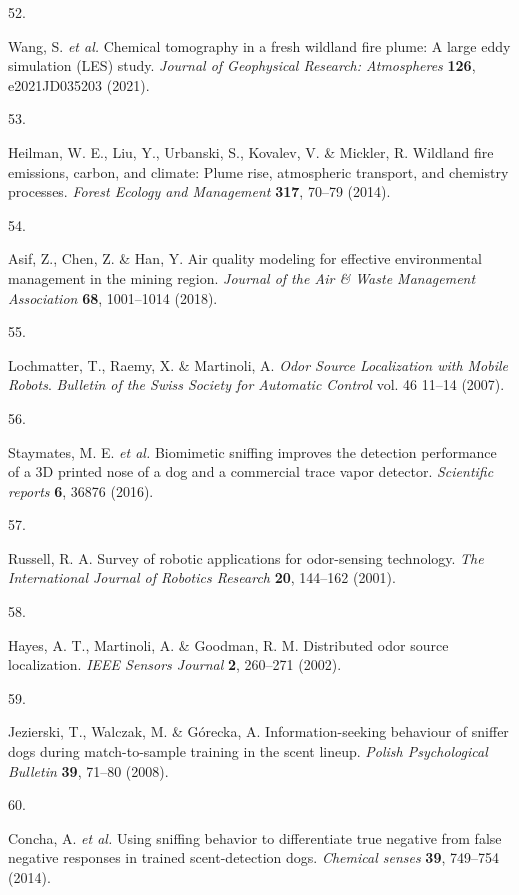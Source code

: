 \documentclass[
]{article}
\newlength{\cslhangindent}
\newlength{\csllabelwidth}
\newlength{\cslentryspacingunit} %
\newenvironment{CSLReferences}[2] %
 {%
  \setlength{\parindent}{0pt}
  \ifodd #1
  \let\oldpar\par
  \def\par{\hangindent=\cslhangindent\oldpar}
  \fi
  \setlength{\parskip}{#2\cslentryspacingunit}
 }%
 {}
\newcommand{\CSLLeftMargin}[1]{\parbox[t]{\csllabelwidth}{#1}}
\newcommand{\CSLRightInline}[1]{\parbox[t]{\linewidth - \csllabelwidth}{#1}\break}
\begin{document}
\begin{CSLReferences}{0}{0}
\leavevmode{}%
\CSLLeftMargin{52. }%
\CSLRightInline{Wang, S. \emph{et al.} Chemical tomography in a fresh wildland fire plume: A large eddy simulation (LES) study. \emph{Journal of Geophysical Research: Atmospheres} \textbf{126}, e2021JD035203 (2021).}

\leavevmode{}%
\CSLLeftMargin{53. }%
\CSLRightInline{Heilman, W. E., Liu, Y., Urbanski, S., Kovalev, V. \& Mickler, R. Wildland fire emissions, carbon, and climate: Plume rise, atmospheric transport, and chemistry processes. \emph{Forest Ecology and Management} \textbf{317}, 70--79 (2014).}

\leavevmode{}%
\CSLLeftMargin{54. }%
\CSLRightInline{Asif, Z., Chen, Z. \& Han, Y. Air quality modeling for effective environmental management in the mining region. \emph{Journal of the Air \& Waste Management Association} \textbf{68}, 1001--1014 (2018).}

\leavevmode{}%
\CSLLeftMargin{55. }%
\CSLRightInline{Lochmatter, T., Raemy, X. \& Martinoli, A. \emph{Odor Source Localization with Mobile Robots}. \emph{Bulletin of the Swiss Society for Automatic Control} vol. 46 11--14 (2007).}

\leavevmode{}%
\CSLLeftMargin{56. }%
\CSLRightInline{Staymates, M. E. \emph{et al.} Biomimetic sniffing improves the detection performance of a 3D printed nose of a dog and a commercial trace vapor detector. \emph{Scientific reports} \textbf{6}, 36876 (2016).}

\leavevmode{}%
\CSLLeftMargin{57. }%
\CSLRightInline{Russell, R. A. Survey of robotic applications for odor-sensing technology. \emph{The International Journal of Robotics Research} \textbf{20}, 144--162 (2001).}

\leavevmode{}%
\CSLLeftMargin{58. }%
\CSLRightInline{Hayes, A. T., Martinoli, A. \& Goodman, R. M. Distributed odor source localization. \emph{IEEE Sensors Journal} \textbf{2}, 260--271 (2002).}

\leavevmode{}%
\CSLLeftMargin{59. }%
\CSLRightInline{Jezierski, T., Walczak, M. \& Górecka, A. Information-seeking behaviour of sniffer dogs during match-to-sample training in the scent lineup. \emph{Polish Psychological Bulletin} \textbf{39}, 71--80 (2008).}

\leavevmode{}%
\CSLLeftMargin{60. }%
\CSLRightInline{Concha, A. \emph{et al.} Using sniffing behavior to differentiate true negative from false negative responses in trained scent-detection dogs. \emph{Chemical senses} \textbf{39}, 749--754 (2014).}

\end{CSLReferences}
\end{document}
